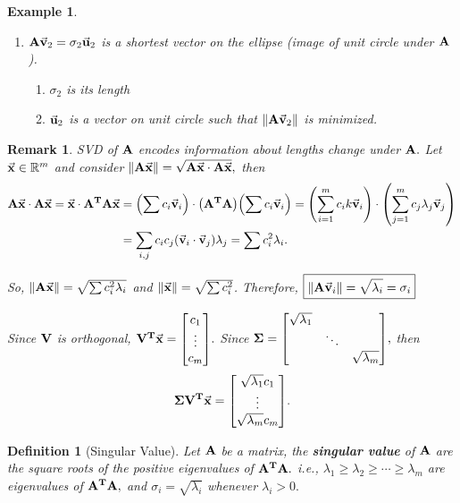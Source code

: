 \documentclass[12pt, a4paper]{article}
\newtheorem{df}{Definition}[subsection]
\newtheorem{eg}{Example}[subsection]
\newtheorem*{rmk}{\indent Remark}
\def\R{{\mathbb{R}}}
\def\T{{\vb{T}}}
\def\vecx{\va{x}}
\def\vecv{\va{v}}
\def\vecu{\va{u}}
\def\matrixA{\vb{A}}
\def\matrixV{\vb{V}}
\def\matrixSig{\vb{\Sigma}}
\begin{document}
\begin{eg}
\begin{enumerate}
		\begin{enumerate}
			\item $\sigma_1$ is its length
			\item $\vecu_1$ is a unit vector pointing in direction.
			\item $\vecv_1$ is a vector on unit circle such $\|\matrixA\vecv_1\|$ is maximized. 
		\end{enumerate}
		\item $\matrixA\vecv_2=\sigma_2\vecu_2$ is a shortest vector on the ellipse (image of unit circle under $\matrixA$).
		\begin{enumerate}
			\item $\sigma_2$ is its length
			\item $\vecu_2$ is a vector on unit circle such that $\|\matrixA\vecv_2\|$ is minimized. 
		\end{enumerate}
	\end{enumerate}
\end{eg}
\begin{rmk}
	SVD of $\matrixA$ encodes information about lengths change under $\matrixA.$ Let $\vecx\in\R^m$ and consider $\|\matrixA\vecx\|=\sqrt{\matrixA\vecx\cdot\matrixA\vecx},$ then \[\begin{aligned}\matrixA\vecx\cdot\matrixA\vecx=\vecx\cdot\matrixA^\T\matrixA\vecx&=\qty(\sum c_i\vecv_i)\cdot\qty(\matrixA^\T\matrixA)\qty(\sum c_i\vecv_i)=\qty(\sum_{i=1}^mc_ik\vecv_i)\cdot\qty(\sum_{j=1}^mc_j\lambda_j\vecv_j)\\&=\sum_{i,j}c_ic_j\qty(\vecv_i\cdot\vecv_j)\lambda_j=\sum c_i^2\lambda_i.\end{aligned}\]\par So, $\|\matrixA\vecx\|=\sqrt{\sum c_i^2\lambda_i}$ and $\|\vecx\|=\sqrt{\sum c_i^2}$. Therefore, $\boxed{\|\matrixA\vecv_i\|=\sqrt{\lambda_i}=\sigma_i}$\par Since $\matrixV$ is orthogonal, $\matrixV^\T\vecx=\mqty[c_1\\\vdots\\c_m].$ Since $\matrixSig=\mqty[\sqrt{\lambda_1}&&\\&\ddots&\\&&\sqrt{\lambda_m}],$ then \[\matrixSig\matrixV^\T\vecx=\mqty[\sqrt{\lambda_1}c_1\\\vdots\\\sqrt{\lambda_m}c_m].\]
\end{rmk}
\begin{df}[Singular Value]
	Let $\matrixA$ be a matrix, the \textbf{singular value} of $\matrixA$ are the square roots of the positive eigenvalues of $\matrixA^\T\matrixA.$ i.e., $\lambda_1\geq\lambda_2\geq\cdots\geq\lambda_m$ are eigenvalues of $\matrixA^\T\matrixA,$ and $\sigma_i=\sqrt{\lambda_i}$ whenever $\lambda_i>0.$
\end{df}
\end{document}
